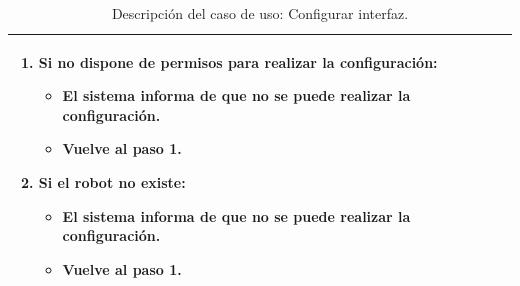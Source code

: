 \begin{table}[H]
\begin{center}
\begin{tabular}{|p{3.5cm}|p{10cm}|}
{\begin{enumerate}
          \item Si no dispone de permisos para realizar la configuración:
          \begin{itemize}
           \item El sistema informa de que no se puede realizar la configuración.
           \item Vuelve al paso 1.
          \end{itemize}
	  \item Si el robot no existe:
	    \begin{itemize}
	      \item El sistema informa de que no se puede realizar la configuración.
	      \item Vuelve al paso 1.
	   \end{itemize}	   
         \end{enumerate}
         }\\
     \hline
    \end{tabular}
  \end{center}
\caption{Descripción del caso de uso: Configurar interfaz.}
\end{table}


